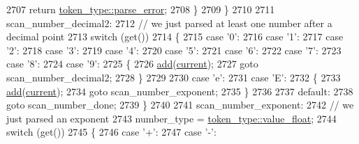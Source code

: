 \begin{DoxyCode}
2707                 \textcolor{keywordflow}{return} \hyperlink{classnlohmann_1_1detail_1_1lexer_a3f313cdbe187cababfc5e06f0b69b098a456e19aeafa334241c7ff3f589547f9d}{token\_type::parse\_error};
2708             \}
2709         \}
2710 
2711 scan\_number\_decimal2:
2712         \textcolor{comment}{// we just parsed at least one number after a decimal point}
2713         \textcolor{keywordflow}{switch} (\textcolor{keyword}{get}())
2714         \{
2715             \textcolor{keywordflow}{case} \textcolor{charliteral}{'0'}:
2716             \textcolor{keywordflow}{case} \textcolor{charliteral}{'1'}:
2717             \textcolor{keywordflow}{case} \textcolor{charliteral}{'2'}:
2718             \textcolor{keywordflow}{case} \textcolor{charliteral}{'3'}:
2719             \textcolor{keywordflow}{case} \textcolor{charliteral}{'4'}:
2720             \textcolor{keywordflow}{case} \textcolor{charliteral}{'5'}:
2721             \textcolor{keywordflow}{case} \textcolor{charliteral}{'6'}:
2722             \textcolor{keywordflow}{case} \textcolor{charliteral}{'7'}:
2723             \textcolor{keywordflow}{case} \textcolor{charliteral}{'8'}:
2724             \textcolor{keywordflow}{case} \textcolor{charliteral}{'9'}:
2725             \{
2726                 \hyperlink{classnlohmann_1_1detail_1_1lexer_acec899d31af1fd647911e46e8535c283}{add}(\hyperlink{classnlohmann_1_1detail_1_1lexer_a47169f9aaf0da4c9885e61d3109859aa}{current});
2727                 \textcolor{keywordflow}{goto} scan\_number\_decimal2;
2728             \}
2729 
2730             \textcolor{keywordflow}{case} \textcolor{charliteral}{'e'}:
2731             \textcolor{keywordflow}{case} \textcolor{charliteral}{'E'}:
2732             \{
2733                 \hyperlink{classnlohmann_1_1detail_1_1lexer_acec899d31af1fd647911e46e8535c283}{add}(\hyperlink{classnlohmann_1_1detail_1_1lexer_a47169f9aaf0da4c9885e61d3109859aa}{current});
2734                 \textcolor{keywordflow}{goto} scan\_number\_exponent;
2735             \}
2736 
2737             \textcolor{keywordflow}{default}:
2738                 \textcolor{keywordflow}{goto} scan\_number\_done;
2739         \}
2740 
2741 scan\_number\_exponent:
2742         \textcolor{comment}{// we just parsed an exponent}
2743         number\_type = \hyperlink{classnlohmann_1_1detail_1_1lexer_a3f313cdbe187cababfc5e06f0b69b098a0d2671a6f81efb91e77f6ac3bdb11443}{token\_type::value\_float};
2744         \textcolor{keywordflow}{switch} (\textcolor{keyword}{get}())
2745         \{
2746             \textcolor{keywordflow}{case} \textcolor{charliteral}{'+'}:
2747             \textcolor{keywordflow}{case} \textcolor{charliteral}{'-'}:

\end{DoxyCode}
